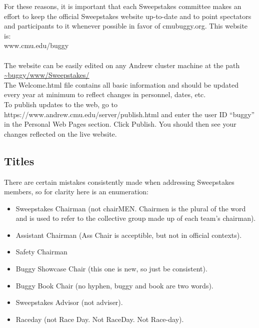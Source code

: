 For these reasons, it is important that each Sweepstakes committee makes
an effort to keep the official Sweepstakes website up-to-date and to point
spectators and participants to it whenever possible in favor of cmubuggy.org.
This website is:
\\
www.cmu.edu/buggy
\\
\\
The website can be easily edited on any Andrew cluster machine at the path
\url{~buggy/www/Sweepstakes/}
\\
The Welcome.html file contains all basic information and should be updated
every year at minimum to reflect changes in personnel, dates, etc.
\\
To publish updates to the web, go to https://www.andrew.cmu.edu/server/publish.html
and enter the user ID ``buggy'' in the Personal Web Pages section. Click Publish.
You should then see your changes reflected on the live website.

\subsection{Titles}
\label{subsec:Titles}
There are certain mistakes consistently made when addressing Sweepstakes
members, so for clarity here is an enumeration:

\begin{itemize}
\item Sweepstakes Chairman (not chairMEN. Chairmen is the plural of the word
and is used to refer to the collective group made up of each team's chairman).
\item Assistant Chairman (Ass Chair is acceptible, but not in official contexts).
\item Safety Chairman
\item Buggy Showcase Chair (this one is new, so just be consistent).
\item Buggy Book Chair (no hyphen, buggy and book are two words).
\item Sweepstakes Advisor (not adviser).
\item Raceday (not Race Day. Not RaceDay. Not Race-day).
\end{itemize}
